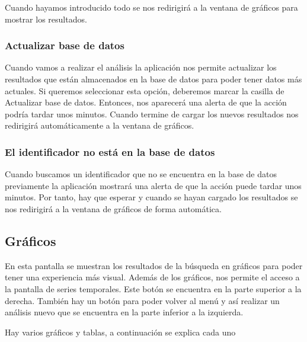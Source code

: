 
Cuando hayamos introducido todo se nos redirigirá a la ventana de gráficos para mostrar los resultados.

\subsubsection{Actualizar base de datos}
Cuando vamos a realizar el análisis la aplicación nos permite actualizar los resultados que están almacenados en la base de datos para poder tener datos más actuales.
Si queremos seleccionar esta opción, deberemos marcar la casilla de Actualizar base de datos.
Entonces, nos aparecerá una alerta de que la acción podría tardar unos minutos. Cuando termine de cargar los nuevos resultados nos redirigirá automáticamente a la ventana de gráficos.


\subsubsection{El identificador no está en la base de datos}
Cuando buscamos un identificador que no se encuentra en la base de datos previamente la aplicación mostrará una alerta de que la acción puede tardar unos minutos. Por tanto, hay que esperar y cuando se hayan cargado los resultados se nos redirigirá a la ventana de gráficos de forma automática.


\subsection{Gráficos}
En esta pantalla se muestran los resultados de la búsqueda en gráficos para poder tener una experiencia más visual.
Además de los gráficos, nos permite el acceso a la pantalla de series temporales. Este botón se encuentra en la parte superior a la derecha. También hay un botón para poder volver al menú y así realizar un análisis nuevo que se encuentra en la parte inferior a la izquierda.



Hay varios gráficos y tablas, a continuación se explica cada uno

